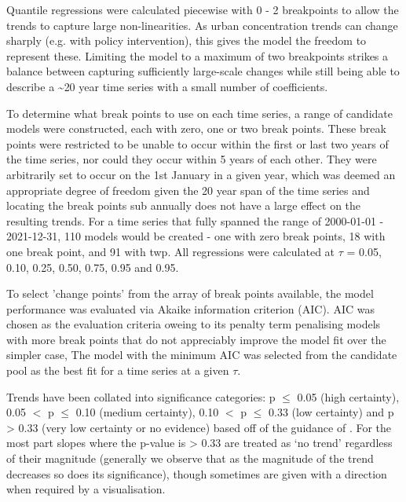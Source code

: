 \documentclass[journal abbreviation, manuscript]{copernicus}
\begin{document}
Quantile regressions were calculated piecewise with 0 - 2 breakpoints to allow the trends to capture large non-linearities. As urban concentration trends can change sharply (e.g. with policy intervention), this gives the model the freedom to represent these. Limiting the model to a maximum of two breakpoints strikes a balance between capturing sufficiently large-scale changes while still being able to describe a \textasciitilde{20} year time series with a small number of coefficients.

To determine what break points to use on each time series, a range of candidate models were constructed, each with zero, one or two break points. These break points were restricted to be unable to occur within the first or last two years of the time series, nor could they occur within 5 years of each other. They were arbitrarily set to occur on the 1st January in a given year, which was deemed an appropriate degree of freedom given the 20 year span of the time series and locating the break points sub annually does not have a large effect on the resulting trends. For a time series that fully spanned the range of 2000-01-01 - 2021-12-31, 110 models would be created - one with zero break points, 18 with one break point, and 91 with twp. All regressions were calculated at $\tau$ = 0.05, 0.10, 0.25, 0.50, 0.75, 0.95 and 0.95.

To select 'change points' from the array of break points available, the model performance was evaluated via Akaike information criterion (AIC). AIC was chosen as the evaluation criteria oweing to its penalty term penalising models with more break points that do not appreciably improve the model fit over the simpler case, The model with the minimum AIC was selected from the candidate pool as the best fit for a time series at a given $\tau$. 

Trends have been collated into significance categories: p $\le$ 0.05 (high certainty), 0.05 $<$ p $\le$ 0.10 (medium certainty), 0.10 $<$ p $\le$ 0.33 (low certainty) and p > 0.33 (very low certainty or no evidence) based off of the guidance of \cite{chang2023guidancenotebeststatistical}. For the most part slopes where the p-value is > 0.33 are treated as ‘no trend’ regardless of their magnitude (generally we observe that as the magnitude of the trend decreases so does its significance), though sometimes are given with a direction when required by a visualisation.
\end{document}
